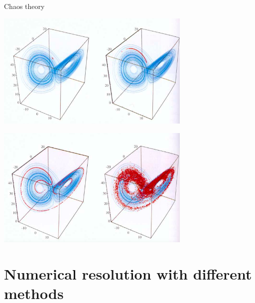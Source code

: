 \documentclass[10pt,xcolor={table,dvipsnames},t]{beamer}
\begin{document}
	\begin{frame}[allowframebreaks]{Chaos theory}
		
		\begin{center}
			\begin{minipage}[c]{.99\linewidth}
				\centering
				\includegraphics[width=0.7\textwidth]{images/chaos1.png}
			\end{minipage}
		\end{center}
		
		\newpage
		
		\begin{center}
			\begin{minipage}[c]{.99\linewidth}
				\centering
				\includegraphics[width=0.7\textwidth]{images/chaos2.png}
			\end{minipage}
		\end{center}
		
	\end{frame}
	
	\section{Numerical resolution with different methods}
	
\end{document}
